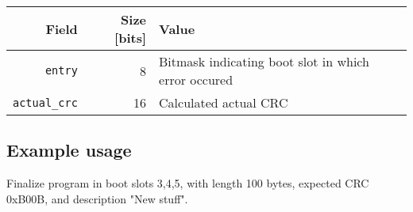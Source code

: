 \begin{tabular}{r | r | l}
	Field & Size [bits] & Value \\
	\hline
	\texttt{entry} & 8 & Bitmask indicating boot slot in which error occured \\	
	\texttt{actual\_crc} & 16 & Calculated actual CRC \\
\end{tabular}


\subsection{Example usage}
Finalize program in boot slots 3,4,5, with length 100 bytes, expected CRC 0xB00B, and description "New stuff".
